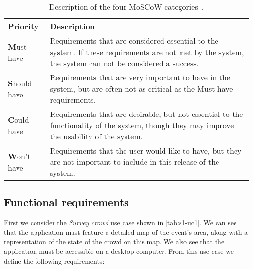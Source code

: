 \begin{table}[h!]
	\centering
	\begin{tabularx}{\textwidth}{lX}
		\toprule
		\textbf{Priority} & \textbf{Description} \\
		\midrule
		\rowcolor[HTML]{EFEFEF} 
		\textbf{M}ust have & Requirements that are considered essential to the system. If these requirements are not met by the system, the system can not be considered a success. \\
		\textbf{S}hould have & Requirements that are very important to have in the system, but are often not as critical as the Must have requirements. \\
		\rowcolor[HTML]{EFEFEF} 
		\textbf{C}ould have & Requirements that are desirable, but not essential to the functionality of the system, though they may improve the usability of the system. \\
		\textbf{W}on't have & Requirements that the user would like to have, but they are not important to include in this release of the system. \\
		\bottomrule
	\end{tabularx}
	\caption{Description of the four MoSCoW categories~\cite{moscow}.}
	\label{tab:moscow}
\end{table}

\subsection{Functional requirements}

First we consider the \emph{Survey crowd} use case shown in \cref{tab:s1-uc1}. We can see that the application must feature a detailed map of the event's area, along with a representation of the state of the crowd on this map. We also see that the application must be accessible on a desktop computer. From this use case we define the following requirements:

